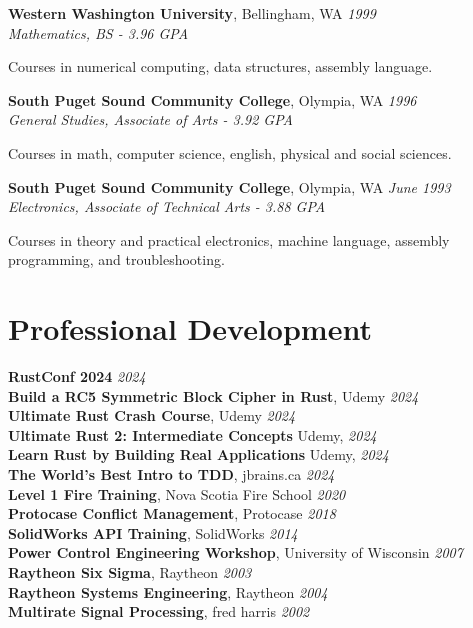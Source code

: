 \documentclass[letter,11pt]{article}
\newenvironment{noindentblock}{%
  \begin{list}{}{%
    \setlength{\leftmargin}{.25in} %
    \setlength{\rightmargin}{0in} %
    \setlength{\topsep}{0pt} %
    \setlength{\parsep}{0pt} %
  }
  \item[]}{\end{list}}
\begin{document}
\noindent
\textbf{Western Washington University}, Bellingham, WA \hfill \textit{1999}\\
\textit{Mathematics, BS - 3.96 GPA}
\begin{noindentblock}
Courses in numerical computing, data structures, assembly language.
\end{noindentblock}

\noindent
\textbf{South Puget Sound Community College}, Olympia, WA \hfill \textit{1996}\\
\textit{General Studies, Associate of Arts - 3.92 GPA}
\begin{noindentblock}
Courses in math, computer science, english, physical and social sciences.
\end{noindentblock}

\noindent
\textbf{South Puget Sound Community College}, Olympia, WA \hfill \textit{June 1993}\\
\textit{Electronics, Associate of Technical Arts - 3.88 GPA}
\begin{noindentblock}
Courses in theory and practical electronics, machine language, assembly programming, and troubleshooting.
\end{noindentblock}

\section*{Professional Development}
\noindent
\textbf{RustConf 2024} \hfill \textit{2024}\\
\noindent
\textbf{Build a RC5 Symmetric Block Cipher in Rust}, Udemy \hfill \textit{2024}\\
\noindent
\textbf{Ultimate Rust Crash Course}, Udemy \hfill \textit{2024}\\
\noindent
\textbf{Ultimate Rust 2: Intermediate Concepts} Udemy, \hfill \textit{2024}\\
\noindent
\textbf{Learn Rust by Building Real Applications} Udemy, \hfill \textit{2024}\\
\noindent
\textbf{The World's Best Intro to TDD}, jbrains.ca \hfill \textit{2024}\\
\noindent
\textbf{Level 1 Fire Training}, Nova Scotia Fire School \hfill \textit{2020}\\
\noindent
\textbf{Protocase Conflict Management}, Protocase \hfill \textit{2018}\\
\noindent
\textbf{SolidWorks API Training}, SolidWorks \hfill \textit{2014}\\
\noindent
\textbf{Power Control Engineering Workshop}, University of Wisconsin \hfill \textit{2007}\\
\noindent
\textbf{Raytheon Six Sigma}, Raytheon \hfill \textit{2003}\\
\noindent
\textbf{Raytheon Systems Engineering}, Raytheon \hfill \textit{2004}\\
\noindent
\textbf{Multirate Signal Processing}, fred harris \hfill \textit{2002}\\
\end{document}
